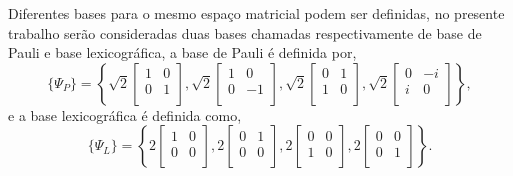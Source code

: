 Diferentes bases para o mesmo espaço matricial podem ser definidas, no presente trabalho serão consideradas duas bases chamadas respectivamente de  base de Pauli e base lexicográfica, a  base de Pauli é definida por,
\begin{equation}\label{base_de_pauli}
\{\Psi_P\} = \left\{
\sqrt{2}\left[\begin{array}{cc}
	1  & 0  \\
	0  & 1 \\
\end{array}\right],
\sqrt{2}\left[\begin{array}{cc}
	1  & 0  \\
	0  & -1  \\
\end{array}\right],
\sqrt{2}\left[\begin{array}{cc}
	0  & 1  \\
	1  & 0  \\
\end{array}\right],
\sqrt{2}\left[\begin{array}{cc}
	0       & -i  \\
	i  & 0  \\
\end{array}\right]
\right\},
\end{equation}
e a base lexicográfica é definida como,
\begin{equation}\label{base_de_lexicografica}
\{\Psi_L\} = \left\{
2\left[\begin{array}{cc}
	1  & 0  \\
	0  & 0 \\
\end{array}\right],
2\left[\begin{array}{cc}
	0  & 1  \\
	0  & 0  \\
\end{array}\right],
2\left[\begin{array}{cc}
	0  & 0  \\
	1  & 0 \\
\end{array}\right],
2\left[\begin{array}{cc}
	0  & 0  \\
	0  & 1  \\
\end{array}\right]
\right\}.
\end{equation}


